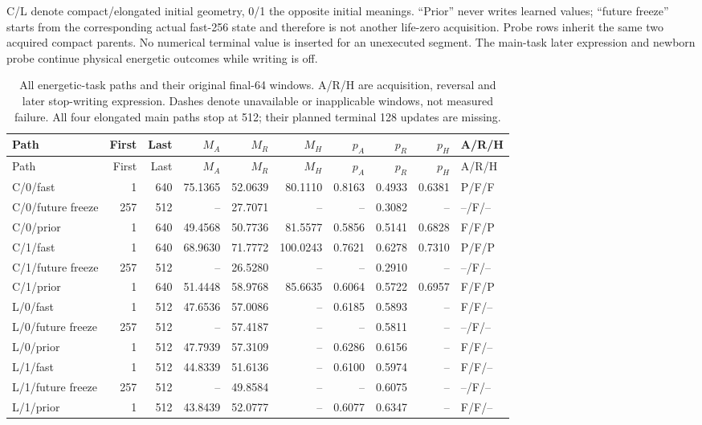 C/L denote compact/elongated initial geometry, 0/1 the opposite initial meanings. ``Prior'' never writes learned values; ``future freeze'' starts from the corresponding actual fast-256 state and therefore is not another life-zero acquisition. Probe rows inherit the same two acquired compact parents. No numerical terminal value is inserted for an unexecuted segment. The main-task later expression and newborn probe continue physical energetic outcomes while writing is off.
\begingroup\scriptsize\setlength{\tabcolsep}{3pt}\setlength{\LTpre}{6pt}\setlength{\LTpost}{6pt}
\begin{longtable}{lrrrrrrrrl}
\caption{All energetic-task paths and their original final-64 windows. A/R/H are acquisition, reversal and later stop-writing expression. Dashes denote unavailable or inapplicable windows, not measured failure. All four elongated main paths stop at 512; their planned terminal 128 updates are missing.}\label{tab:young-phases}\\
\toprule
Path & First & Last & $M_A$ & $M_R$ & $M_H$ & $p_A$ & $p_R$ & $p_H$ & A/R/H \\
\midrule\endfirsthead
\toprule
Path & First & Last & $M_A$ & $M_R$ & $M_H$ & $p_A$ & $p_R$ & $p_H$ & A/R/H \\
\midrule\endhead
C/0/fast & 1 & 640 & 75.1365 & 52.0639 & 80.1110 & 0.8163 & 0.4933 & 0.6381 & P/F/F \\
C/0/future freeze & 257 & 512 & -- & 27.7071 & -- & -- & 0.3082 & -- & --/F/-- \\
C/0/prior & 1 & 640 & 49.4568 & 50.7736 & 81.5577 & 0.5856 & 0.5141 & 0.6828 & F/F/P \\
C/1/fast & 1 & 640 & 68.9630 & 71.7772 & 100.0243 & 0.7621 & 0.6278 & 0.7310 & P/F/P \\
C/1/future freeze & 257 & 512 & -- & 26.5280 & -- & -- & 0.2910 & -- & --/F/-- \\
C/1/prior & 1 & 640 & 51.4448 & 58.9768 & 85.6635 & 0.6064 & 0.5722 & 0.6957 & F/F/P \\
L/0/fast & 1 & 512 & 47.6536 & 57.0086 & -- & 0.6185 & 0.5893 & -- & F/F/-- \\
L/0/future freeze & 257 & 512 & -- & 57.4187 & -- & -- & 0.5811 & -- & --/F/-- \\
L/0/prior & 1 & 512 & 47.7939 & 57.3109 & -- & 0.6286 & 0.6156 & -- & F/F/-- \\
L/1/fast & 1 & 512 & 44.8339 & 51.6136 & -- & 0.6100 & 0.5974 & -- & F/F/-- \\
L/1/future freeze & 257 & 512 & -- & 49.8584 & -- & -- & 0.6075 & -- & --/F/-- \\
L/1/prior & 1 & 512 & 43.8439 & 52.0777 & -- & 0.6077 & 0.6347 & -- & F/F/-- \\
\bottomrule
\end{longtable}
